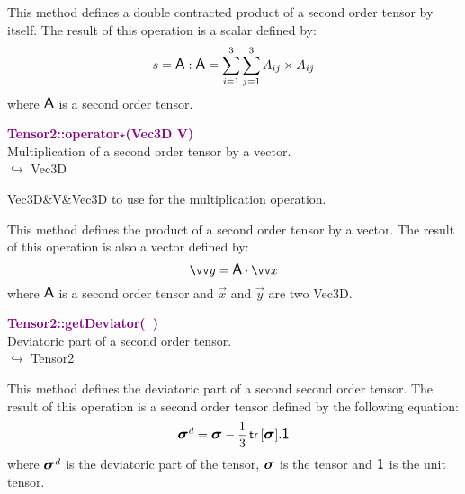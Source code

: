 This method defines a double contracted product of a second order tensor by itself.
The result of this operation is a scalar defined by:
\begin{equation*}
s = \mbox{\large\ensuremath{\mathsf{A}}} : \mbox{\large\ensuremath{\mathsf{A}}} = \sum_{i=1}^{3} \sum_{j=1}^{3} A_{ij}\times A_{ij}
\end{equation*}
where $\mbox{\large\ensuremath{\mathsf{A}}}$ is a second order tensor.

\textcolor{purple}{\textbf{Tensor2::operator$\star$(Vec3D V)}}\label{Tensor2::operator*(Vec3D V)}\\
Multiplication of a second order tensor by a vector.\\ \hspace*{10mm}$\hookrightarrow$ Vec3D

\begin{tcolorbox}[width=\textwidth,myArgs,tabularx={ll|R}]
Vec3D&V&Vec3D to use for the multiplication operation.
\end{tcolorbox}

This method defines the product of a second order tensor by a vector.
The result of this operation is also a vector defined by:
\begin{equation*}
\overrightarrow{y} = \A \cdot \overrightarrow{x}
\end{equation*}
where $\mbox{\large\ensuremath{\mathsf{A}}}$ is a second order tensor and $\overrightarrow{x}$ and $\overrightarrow{y}$ are two Vec3D.

\textcolor{purple}{\textbf{Tensor2::getDeviator(~)}}\label{Tensor2::getDeviator()}\\
Deviatoric part of a second order tensor.\\ \hspace*{10mm}$\hookrightarrow$ Tensor2

This method defines the deviatoric part of a second second order tensor.
The result of this operation is a second order tensor defined by the following equation:
\begin{equation*}
\mbox{\large\ensuremath{\boldsymbol{\sigma}}}^d=\mbox{\large\ensuremath{\boldsymbol{\sigma}}}-\frac{1}{3}\mbox{\ensuremath{\mathsf{\,tr\,}}}[\mbox{\large\ensuremath{\boldsymbol{\sigma}}}].\mbox{\large\ensuremath{\mathsf{1}}}
\end{equation*}
where $\mbox{\large\ensuremath{\boldsymbol{\sigma}}}^d$ is the deviatoric part of the tensor, $\mbox{\large\ensuremath{\boldsymbol{\sigma}}}$ is the tensor and $\mbox{\large\ensuremath{\mathsf{1}}}$ is the unit tensor.

